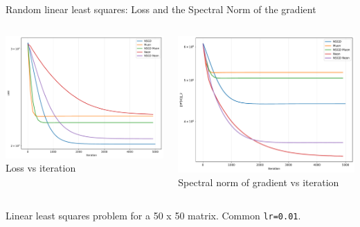 \documentclass[aspectratio=169]{beamer}
\begin{document}
\begin{frame}{Random linear least squares: Loss and the Spectral Norm of the gradient}
  \begin{columns}[T,totalwidth=\textwidth]
    \begin{column}{0.48\textwidth}
      \includegraphics[width=\linewidth]{simple_lls/loss_vs_iteration_50x50.pdf}
      \centering
      \scriptsize Loss vs iteration
    \end{column}
    \begin{column}{0.48\textwidth}
      \includegraphics[width=\linewidth]{simple_lls/gradient_spectral_norm_vs_iteration_50x50.pdf}
      \centering
      \scriptsize Spectral norm of gradient vs iteration
    \end{column}
  \end{columns}
  \vspace{0.3em}
  \centering
  \footnotesize Linear least squares problem for a 50 x 50 matrix. Common {\tt lr=0.01}.
\end{frame}
\end{document}

